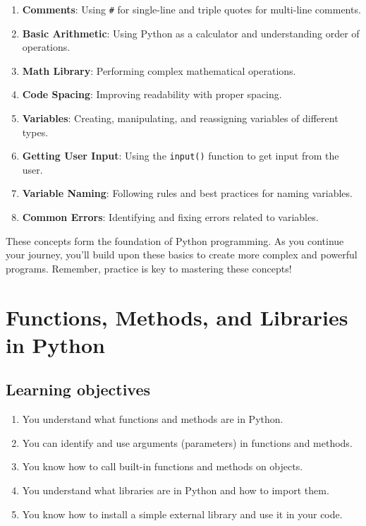 \documentclass[
  letterpaper,
  DIV=11,
  numbers=noendperiod]{scrreprt}
\providecommand{\tightlist}{%
  \setlength{\itemsep}{0pt}\setlength{\parskip}{0pt}}\usepackage{longtable,booktabs,array}
\begin{document}
\begin{enumerate}
\def\labelenumi{\arabic{enumi}.}
\tightlist
\item
  \textbf{Comments}: Using \texttt{\#} for single-line and triple quotes
  for multi-line comments.
\item
  \textbf{Basic Arithmetic}: Using Python as a calculator and
  understanding order of operations.
\item
  \textbf{Math Library}: Performing complex mathematical operations.
\item
  \textbf{Code Spacing}: Improving readability with proper spacing.
\item
  \textbf{Variables}: Creating, manipulating, and reassigning variables
  of different types.
\item
  \textbf{Getting User Input}: Using the \texttt{input()} function to
  get input from the user.
\item
  \textbf{Variable Naming}: Following rules and best practices for
  naming variables.
\item
  \textbf{Common Errors}: Identifying and fixing errors related to
  variables.
\end{enumerate}

These concepts form the foundation of Python programming. As you
continue your journey, you'll build upon these basics to create more
complex and powerful programs. Remember, practice is key to mastering
these concepts!

\chapter{Functions, Methods, and Libraries in
Python}\label{functions-methods-and-libraries-in-python}

\section{Learning objectives}\label{learning-objectives-2}

\begin{enumerate}
\def\labelenumi{\arabic{enumi}.}
\tightlist
\item
  You understand what functions and methods are in Python.
\item
  You can identify and use arguments (parameters) in functions and
  methods.
\item
  You know how to call built-in functions and methods on objects.
\item
  You understand what libraries are in Python and how to import them.
\item
  You know how to install a simple external library and use it in your
  code.
\end{enumerate}
\end{document}
